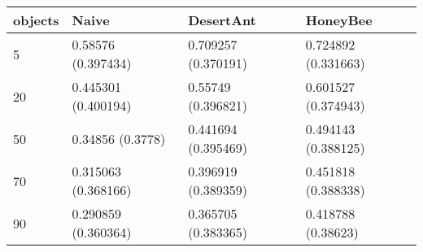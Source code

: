 \begin{tabular} {|l|l|l|l|}
\hline
objects & Naive & DesertAnt & HoneyBee \\
\hline
5 & 0.58576 (0.397434)  & 0.709257 (0.370191)  & 0.724892 (0.331663)  \\
20 & 0.445301 (0.400194)  & 0.55749 (0.396821)  & 0.601527 (0.374943)  \\
50 & 0.34856 (0.3778)  & 0.441694 (0.395469)  & 0.494143 (0.388125)  \\
70 & 0.315063 (0.368166)  & 0.396919 (0.389359)  & 0.451818 (0.388338)  \\
90 & 0.290859 (0.360364)  & 0.365705 (0.383365)  & 0.418788 (0.38623)  \\
\hline
\end{tabular}

